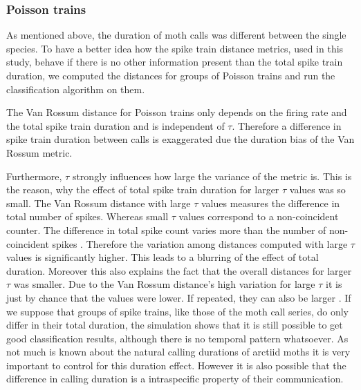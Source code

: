 \documentclass[12pt,a4paper]{article}
\begin{document}
\subsubsection{Poisson trains}
\label{PoissonTrains_Discussion}
As mentioned above, the duration of moth calls was different between the single species. To have a better idea how the spike train distance metrics, used in this study, behave if there is no other information present than the total spike train duration, we computed the distances for groups of Poisson trains and run the classification algorithm on them.

The Van Rossum distance for Poisson trains only depends on the firing rate and the total spike train duration and is independent of $ \tau $. Therefore a difference in spike train duration between calls is exaggerated due the duration bias of the Van Rossum metric. 

Furthermore, $ \tau $ strongly influences how large the variance of the metric is. This is the reason, why the effect of total spike train duration for larger $ \tau $ values was so small. The Van Rossum distance with large $ \tau $ values measures the difference in total number of spikes. Whereas small $ \tau $ values correspond to  a non-coincident counter. The difference in total spike count varies more than the number of non-coincident spikes \cite{rossum2001}. Therefore the variation among distances computed with large $ \tau $ values is significantly higher. This leads to a blurring of the effect of total duration. Moreover this also explains the fact that the overall distances for larger $ \tau $ was smaller. Due to the Van Rossum distance's high variation for large $ \tau $ it is just by chance that the values were lower. If repeated, they can also be larger \cite{rossum2001}. If we suppose that groups of spike trains, like those of the moth call series, do only differ in their total duration, the simulation shows that it is still possible to get good classification results, although there is no temporal pattern whatsoever. As not much is known about the natural calling durations of arctiid moths it is very important to control for this duration effect. However it is also possible that the difference in calling duration is a intraspecific property of their communication. 
\end{document}
